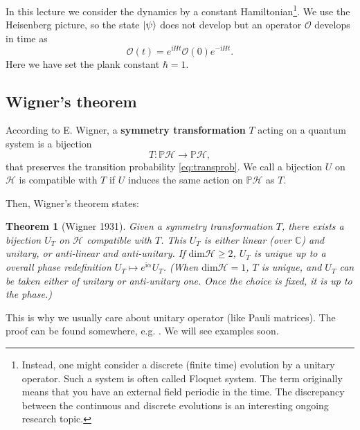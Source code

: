 \documentclass[
]{scrartcl}
\numberwithin{equation}{section}
\newtheorem{theorem}{Theorem}[section]
\theoremstyle{definition}
\theoremstyle{definition}
\theoremstyle{definition}
\theoremstyle{definition}
\theoremstyle{remark}
\begin{document}
In this lecture we consider the dynamics by a constant Hamiltonian\footnote{Instead, one might consider a discrete (finite time) evolution by a unitary operator.
  Such a system is often called Floquet system. The term originally means that you have an external field periodic in the time. The discrepancy between the continuous and discrete evolutions is an interesting ongoing research topic.}.
We use the Heisenberg picture, so the state \(\ket{\psi}\) does not develop but an operator \(\mathcal{O}\)
develops in time as
\begin{equation}
  \label{eq:Odev}
  \mathcal{O}(t) = e^{\mathrm{i}H t} \mathcal{O}(0) e^{-\mathrm{i}H t}.
\end{equation}
Here we have set the plank constant \(\hbar =1\).

\hypertarget{wigners-theorem}{%
\subsection{Wigner's theorem}\label{wigners-theorem}}

According to E. Wigner, a \textbf{symmetry transformation} \(T\) acting on a quantum system is a bijection
\begin{equation}
  \label{eq:sym}
  T: \mathbb{P}\mathcal{H} \to \mathbb{P}\mathcal{H},
\end{equation}
that preserves the transition probability \eqref{eq:transprob}.
We call a bijection \(U\) on \(\mathcal{H}\) is compatible with \(T\) if \(U\) induces the same action on \(\mathbb{P}\mathcal{H}\) as \(T\).

Then, Wigner's theorem states:

\begin{theorem}[Wigner 1931]
Given a symmetry transformation \(T\), there exists a bijection \(U_T\) on \(\mathcal{H}\) compatible with \(T\).
This \(U_T\) is either linear (over \(\mathbb{C}\)) and unitary, or anti-linear and anti-unitary. If \(\mathrm{dim}\mathcal{H}\ge 2\), \(U_T\) is unique up to a overall phase redefinition \(U_T \mapsto e^{\mathrm{i}\alpha}U_T\). (When \(\mathrm{dim}\mathcal{H} = 1\), \(T\) is unique, and \(U_T\) can be taken either of unitary or anti-unitary one. Once the choice is fixed, it is up to the phase.)
\end{theorem}

This is why we usually care about unitary operator (like Pauli matrices).
The proof can be found somewhere, e.g. \textcite{Weinberg:1995mt}. We will see examples soon.
\end{document}
